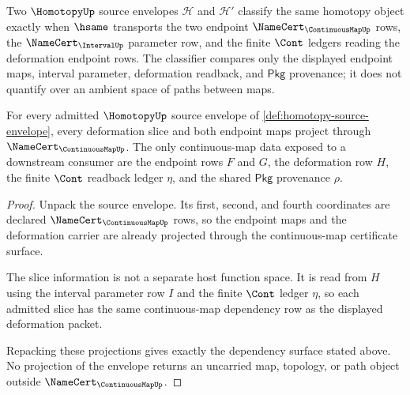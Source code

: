 \begin{definition}
\label{def:homotopy-classifier-surface}
Two $\HomotopyUp$ source envelopes $\mathcal{H}$ and $\mathcal{H}'$ classify the same homotopy object exactly when $\hsame$ transports the two endpoint $\NameCert_{\ContinuousMapUp}$ rows, the $\NameCert_{\IntervalUp}$ parameter row, and the finite $\Cont$ ledgers reading the deformation endpoint rows. The classifier compares only the displayed endpoint maps, interval parameter, deformation readback, and $\mathsf{Pkg}$ provenance; it does not quantify over an ambient space of paths between maps.
\end{definition}

\begin{theorem}
\label{thm:homotopy-continuousmap-dependency-surface}
For every admitted $\HomotopyUp$ source envelope of \autoref{def:homotopy-source-envelope}, every deformation slice and both endpoint maps project through $\NameCert_{\ContinuousMapUp}$. The only continuous-map data exposed to a downstream consumer are the endpoint rows $F$ and $G$, the deformation row $H$, the finite $\Cont$ readback ledger $\eta$, and the shared $\mathsf{Pkg}$ provenance $\rho$.
\end{theorem}
\begin{proof}
Unpack the source envelope. Its first, second, and fourth coordinates are declared $\NameCert_{\ContinuousMapUp}$ rows, so the endpoint maps and the deformation carrier are already projected through the continuous-map certificate surface.

The slice information is not a separate host function space. It is read from $H$ using the interval parameter row $I$ and the finite $\Cont$ ledger $\eta$, so each admitted slice has the same continuous-map dependency row as the displayed deformation packet.

Repacking these projections gives exactly the dependency surface stated above. No projection of the envelope returns an uncarried map, topology, or path object outside $\NameCert_{\ContinuousMapUp}$.
\end{proof}

